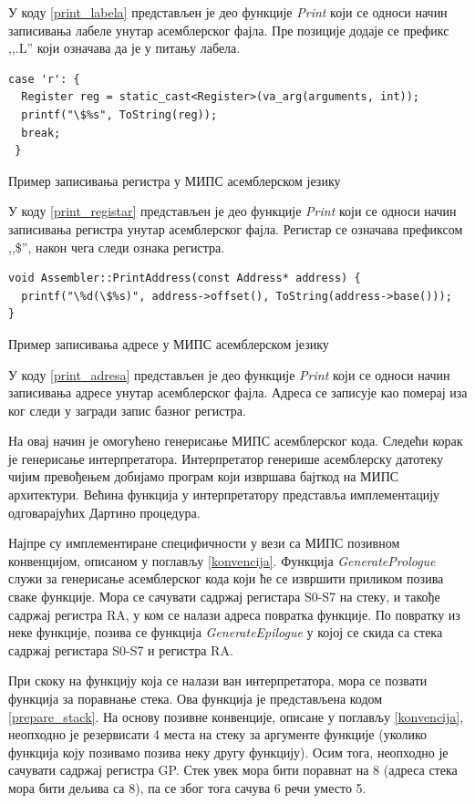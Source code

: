 \documentclass[12pt,oneside]{memoir}
\begin{document}
У коду \ref{print_labela} представљен је део функције \textit{Print} који се односи начин записивања лабеле унутар асемблерског фајла. Пре позиције додаје се префикс ,,.L'' који означава да је у питању лабела.

\begin{listing}
\begin{verbatim}
case 'r': {
  Register reg = static_cast<Register>(va_arg(arguments, int));
  printf("\$%s", ToString(reg));
  break;
 }
\end{verbatim}
\caption{Пример записивања регистра у МИПС асемблерском језику}
\label{print_registar}
\end{listing}
У коду \ref{print_registar} представљен је део функције \textit{Print} који се односи начин записивања регистра унутар асемблерског фајла. Регистар се означава префиксом ,,\$'', након чега следи ознака регистра.

\begin{listing}
\begin{verbatim}
void Assembler::PrintAddress(const Address* address) {
  printf("\%d(\$%s)", address->offset(), ToString(address->base()));
}
\end{verbatim}
\caption{Пример записивања адресе у МИПС асемблерском језику}
\label{print_adresa}
\end{listing}
У коду \ref{print_adresa} представљен је део функције \textit{Print} који се односи начин записивања адресе унутар асемблерског фајла. Адреса се записује као померај иза ког следи у загради запис базног регистра.


На овај начин је омогућено генерисање МИПС асемблерског кода. Следећи корак је генерисање интерпретатора. Интерпретатор генерише асемблерску датотеку чијим превођењем добијамо програм који извршава бајткод на МИПС архитектури. Већина функција у интерпретатору представља имплементацију одговарајућих Дартино процедура.

Најпре су имплементиране специфичности у вези са МИПС позивном конвенцијом, описаном у поглављу \ref{konvencija}. Функција \textit{GeneratePrologue} служи за генерисање асемблерског кода који ће се извршити приликом позива сваке  функције. Мора се сачувати садржај регистара S0-S7 на стеку, и такође садржај регистра RA, у ком се налази адреса повратка функције. По повратку из неке функције, позива се функција \textit{GenerateEpilogue} у којој се скида са стека садржај регистара S0-S7 и регистра RA.

При скоку на функцију која се налази ван интерпретатора, мора се позвати функција за поравнање стека. Ова функција је представљена кодом \ref{prepare_stack}.
На основу позивне конвенције, описане у поглављу \ref{konvencija}, неопходно је резервисати 4 места на стеку за аргументе функције (уколико функција коју позивамо позива неку другу функцију). Осим тога, неопходно је сачувати садржај регистра GP. Стек увек мора бити поравнат на 8 (адреса стека мора бити дељива са 8), па се због тога сачува 6 речи уместо 5.\\
\end{document}
